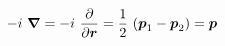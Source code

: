\begin{equation}
-i~\mbox{\boldmath$\nabla$} =-i~\frac{\partial}{\partial \mbox{\boldmath$r$}}=\frac{1}{2}~(\mbox{\boldmath$p$}_1-
\mbox{\boldmath$p$}_2)=  \mbox{\boldmath$p$}   
\end{equation}

